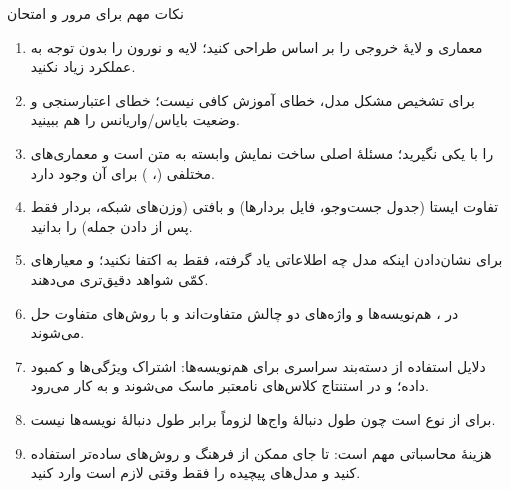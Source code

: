 \begin{exambox}{نکات مهم برای مرور و امتحان}
\begin{enumerate}
  \item معماری و لایهٔ خروجی را بر اساس  طراحی کنید؛ لایه و نورون را بدون توجه به عملکرد زیاد نکنید.
  \item برای تشخیص مشکل مدل، خطای آموزش کافی نیست؛ خطای اعتبارسنجی و وضعیت بایاس/واریانس را هم ببینید.
  \item {} را با  یکی نگیرید؛ مسئلهٔ اصلی ساخت نمایش وابسته به متن است و معماری‌های مختلفی (، ) برای آن وجود دارد.
  \item تفاوت ایستا (جدول جست‌وجو، فایل بردارها) و بافتی (وزن‌های شبکه، بردار فقط پس از دادن جمله) را بدانید.
  \item برای نشان‌دادن اینکه مدل چه اطلاعاتی یاد گرفته، فقط به  اکتفا نکنید؛  و معیارهای کمّی شواهد دقیق‌تری می‌دهند.
  \item در ، هم‌نویسه‌ها و واژه‌های  دو چالش متفاوت‌اند و با روش‌های متفاوت حل می‌شوند.
  \item دلایل استفاده از دسته‌بند سراسری برای هم‌نویسه‌ها: اشتراک ویژگی‌ها و کمبود داده؛ و در استنتاج کلاس‌های نامعتبر ماسک می‌شوند و  به کار می‌رود.
  \item {} برای  از نوع  است چون طول دنبالهٔ واج‌ها لزوماً برابر طول دنبالهٔ نویسه‌ها نیست.
  \item هزینهٔ محاسباتی مهم است: تا جای ممکن از فرهنگ و روش‌های ساده‌تر استفاده کنید و مدل‌های پیچیده را فقط وقتی لازم است وارد کنید.
\end{enumerate}
\end{exambox}

